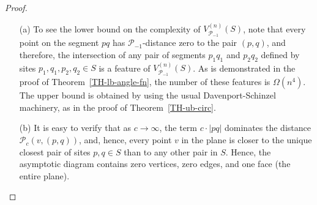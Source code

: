 \documentclass[10pt, conference, compsocconf]{IEEEtran}
\def\PP{{\mathcal P}}
\begin{document}
\begin{proof}
   \begin{itemize}

   \item[(a)]
      To see the lower bound on the complexity of $V_{\PP_{-1}}^{(n)}(S)$,
      note that every point
      on the segment $pq$ has $\PP_{-1}$-distance zero to the pair $(p,q)$,
      and therefore, the intersection of any pair of segments $p_1 q_1$ and
      $p_2 q_2$ defined by sites $p_1, q_1, p_2, q_2 \in S$ is a feature of
      $V_{\PP_{-1}}^{(n)}(S)$.
      As is demonstrated in the proof of Theorem~\ref{TH-lb-angle-fn},
      the number of these features is $\Omega(n^4)$.
      The upper bound is obtained by using the usual Davenport-Schinzel
      machinery, as in the proof of Theorem~\ref{TH-ub-circ}.

   \item[(b)]
      It is easy to verify that as $c \to \infty$, the term $c \cdot |pq|$
      dominates the distance $\PP_c(v,(p,q))$, and, hence, every point $v$
      in the plane is closer to the unique closest pair of sites
      $p,q \in S$ than to any other pair in $S$.  Hence, the asymptotic
      diagram contains zero vertices, zero edges, and one face (the entire
      plane).


\end{itemize}
\end{proof}
\end{document}
